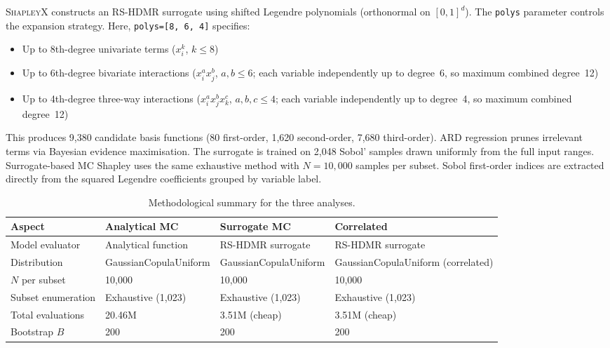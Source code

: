 \documentclass[11pt,a4paper]{article}
\begin{document}
\textsc{ShapleyX} constructs an RS-HDMR surrogate \cite{Li2002} using shifted Legendre polynomials (orthonormal on $[0,1]^d$). The \texttt{polys} parameter controls the expansion strategy. Here, \texttt{polys=[8, 6, 4]} specifies:

\begin{itemize}[nosep]
    \item Up to 8th-degree univariate terms ($x_i^k$, $k \le 8$)
    \item Up to 6th-degree bivariate interactions ($x_i^a x_j^b$, $a,b \le 6$; each variable independently up to degree~6, so maximum combined degree~12)
    \item Up to 4th-degree three-way interactions ($x_i^a x_j^b x_k^c$, $a,b,c \le 4$; each variable independently up to degree~4, so maximum combined degree~12)
\end{itemize}

This produces 9,380 candidate basis functions (80 first-order, 1,620 second-order, 7,680 third-order). ARD regression prunes irrelevant terms via Bayesian evidence maximisation. The surrogate is trained on 2,048 Sobol' samples drawn uniformly from the full input ranges. Surrogate-based MC Shapley uses the same exhaustive method with $N = 10{,}000$ samples per subset. Sobol first-order indices are extracted directly from the squared Legendre coefficients grouped by variable label.

\begin{table}[H]
\centering
\caption{Methodological summary for the three analyses.}
\label{tab:methods}
\begin{tabular}{p{3.5cm}p{4cm}p{4cm}p{3cm}}
\toprule
\textbf{Aspect} & \textbf{Analytical MC} & \textbf{Surrogate MC} & \textbf{Correlated} \\
\midrule
Model evaluator & Analytical function & RS-HDMR surrogate & RS-HDMR surrogate \\
Distribution & GaussianCopulaUniform & GaussianCopulaUniform & GaussianCopulaUniform (correlated) \\
$N$ per subset & 10,000 & 10,000 & 10,000 \\
Subset enumeration & Exhaustive (1,023) & Exhaustive (1,023) & Exhaustive (1,023) \\
Total evaluations & 20.46M & 3.51M (cheap) & 3.51M (cheap) \\
Bootstrap $B$ & 200 & 200 & 200 \\
\bottomrule
\end{tabular}
\end{table}
\end{document}
